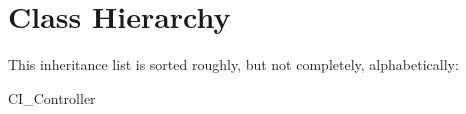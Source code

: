\section{Class Hierarchy}
This inheritance list is sorted roughly, but not completely, alphabetically\+:\begin{DoxyCompactList}
\item C\+I\+\_\+\+Controller\begin{DoxyCompactList}
\item {}
\item {}
\item {}
\item {}
\item {}
\item {}
\end{DoxyCompactList}
\end{DoxyCompactList}
